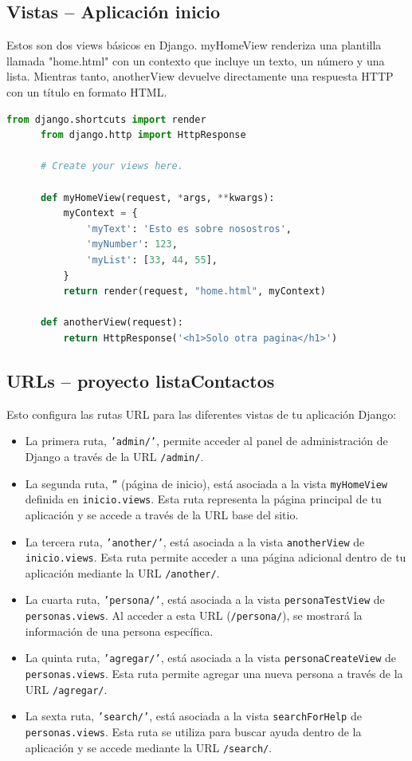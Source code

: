 \documentclass{article}
\begin{document}
  

  \subsection{Vistas -- Aplicación inicio}
    Estos son dos views básicos en Django. myHomeView renderiza una plantilla llamada "home.html" con un contexto que 
    incluye un texto, un número y una lista. Mientras tanto, anotherView devuelve directamente una respuesta HTTP con 
    un título en formato HTML.
    \begin{lstlisting}[language=python]
      from django.shortcuts import render
      from django.http import HttpResponse

      # Create your views here.

      def myHomeView(request, *args, **kwargs):
          myContext = {
              'myText': 'Esto es sobre nosostros',
              'myNumber': 123,
              'myList': [33, 44, 55],
          }
          return render(request, "home.html", myContext)
          
      def anotherView(request):
          return HttpResponse('<h1>Solo otra pagina</h1>')
    \end{lstlisting}

  

  \subsection{URLs -- proyecto listaContactos}
    Esto configura las rutas URL para las diferentes vistas de tu aplicación Django:
    \begin{itemize}
      \item La primera ruta, \texttt{'admin/'}, permite acceder al panel de administración de Django a través de la URL \texttt{/admin/}.  
      \item La segunda ruta, \texttt{''} (página de inicio), está asociada a la vista \texttt{myHomeView} definida en \texttt{inicio.views}. Esta ruta representa la página principal de tu aplicación y se accede a través de la URL base del sitio.   
      \item La tercera ruta, \texttt{'another/'}, está asociada a la vista \texttt{anotherView} de \texttt{inicio.views}. Esta ruta permite acceder a una página adicional dentro de tu aplicación mediante la URL \texttt{/another/}.   
      \item La cuarta ruta, \texttt{'persona/'}, está asociada a la vista \texttt{personaTestView} de \texttt{personas.views}. Al acceder a esta URL (\texttt{/persona/}), se mostrará la información de una persona específica.  
      \item La quinta ruta, \texttt{'agregar/'}, está asociada a la vista \texttt{personaCreateView} de \texttt{personas.views}. Esta ruta permite agregar una nueva persona a través de la URL \texttt{/agregar/}.    
      \item La sexta ruta, \texttt{'search/'}, está asociada a la vista \texttt{searchForHelp} de \texttt{personas.views}. Esta ruta se utiliza para buscar ayuda dentro de la aplicación y se accede mediante la URL \texttt{/search/}.
    \end{itemize}
\end{document}
